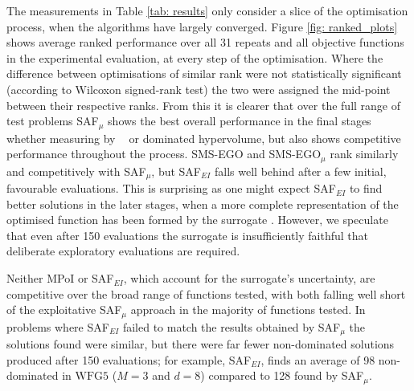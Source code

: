 \documentclass[conference]{IEEEtran}
\newcommand{\ndim}{d}
\newcommand{\nobj}{M}
\DeclareMathOperator*{\igdp}{IGD^{+}}
\newcommand\hpv{dominated hypervolume\xspace}
\newcommand\safmu{SAF$_{\mu}$\xspace}
\newcommand\safei{SAF$_{EI}$\xspace}
\newcommand\smsego{SMS-EGO\xspace}
\newcommand\smsegomu{SMS-EGO$_{\mu}$\xspace}
\newcommand\mpoi{MPoI\xspace}
\begin{document}
The measurements in Table \ref{tab: results} only consider a slice of the optimisation process, when the algorithms have largely converged. Figure \ref{fig: ranked_plots} shows average ranked performance over all 31 repeats and all objective functions in the experimental evaluation, at every step of the optimisation. Where the difference between optimisations of similar rank were not statistically significant (according to Wilcoxon signed-rank test) the two were assigned the mid-point between their respective ranks. From this it is  clearer that over the full  range of test problems \safmu shows the  best overall performance in the final stages whether measuring by $\igdp$ or \hpv, but also shows competitive performance throughout the process. \smsego and \smsegomu rank similarly and competitively with \safmu, but \safei falls well behind after a few initial, favourable evaluations. This is surprising as one might expect \safei to find better solutions in the later stages, when a more complete representation of the optimised function has been formed by the surrogate \cite{death2019greed}. However, we speculate that even after 150 evaluations the surrogate is insufficiently faithful that deliberate exploratory evaluations are required. 

Neither \mpoi or \safei, which account for the surrogate's uncertainty, are competitive over the broad range of functions tested, with both falling well short of the exploitative \safmu approach in the majority of functions tested. In problems where \safei failed to match the results obtained by \safmu the solutions found were similar, but there were far fewer non-dominated solutions produced after 150 evaluations; for example, \safei, finds an average of 98 non-dominated in $\text{WFG}5$ ($\nobj = 3$ and $\ndim = 8$) compared to 128 found by \safmu.
\end{document}
